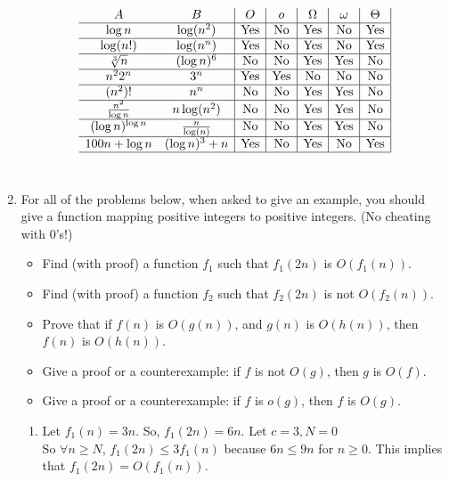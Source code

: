 \documentclass[11pt]{article}
\begin{document}
\begin{enumerate}
$$
\begin{array}{cc|c|c|c|c|c|}
A & B & O & o & \Omega & \omega & \Theta \\ \hline
\log{n} & \log(n^2) &\textup{Yes} &\textup{No} &\textup{Yes} &\textup{No} &\textup{Yes} \\ \hline
\log (n!) & \log(n^n) &\textup{Yes} &\textup{No} &\textup{Yes} &\textup{No} &\textup{Yes} \\ \hline
\sqrt[3]{n} & (\log n)^{6} &\textup{No} &\textup{No} &\textup{Yes} &\textup{Yes} &\textup{No} \\ \hline
n^22^n & 3^n &\textup{Yes} &\textup{Yes} &\textup{No} &\textup{No} &\textup{No} \\ \hline
(n^2)! & n^n &\textup{No} &\textup{No} &\textup{Yes} &\textup{Yes} &\textup{No} \\ \hline
{n^2 \over \log{n}} & n \log(n^2) &\textup{No} &\textup{No} &\textup{Yes} &\textup{Yes} &\textup{No} \\ \hline
(\log n)^{\log n} & {n \over \log(n)} &\textup{No} &\textup{No} &\textup{Yes} &\textup{Yes} &\textup{No} \\ \hline
100n + \log n & (\log n)^{3} + n &\textup{Yes} &\textup{No} &\textup{Yes} &\textup{No} &\textup{Yes} \\ \hline
\end{array}
$$ \\


\item 
For all of the problems below, when asked to give an example, you
should give a function mapping positive integers to positive integers.
(No cheating with 0's!)
\begin{itemize}
\item Find (with proof) a function $f_1$ such that $f_1(2n)$ is $O(f_1(n))$.
\item Find (with proof) a function $f_2$ such that $f_2(2n)$ is not $O(f_2(n))$.
\item Prove that if $f(n)$ is $O(g(n))$, and $g(n)$ is $O(h(n))$, then 
$f(n)$ is $O(h(n))$.  
\item Give a proof or a counterexample:  if $f$ is not $O(g)$, then $g$ is $O(f)$.  
\item Give a proof or a counterexample:  if $f$ is $o(g)$, then $f$ is $O(g)$.  
\end{itemize}

\begin{enumerate}
	\item Let $f_1(n) = 3n$.  So, $f_1(2n) = 6n$.  Let $c = 3, N = 0$ \\
	So $\forall n\geq N$, $f_1(2n) \leq 3f_1(n)$ because $6n \leq 9n$ for $n\geq 0$.  This implies that $f_1(2n) = O(f_1(n))$. \\
	

\end{enumerate}
\end{enumerate}
\end{document}
